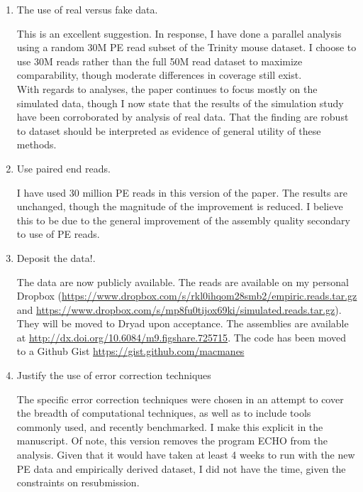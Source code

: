 \documentclass[11pt]{article}
\begin{document}
\begin{enumerate}


\item The use of real versus fake data. 

\begin{addmargin}[2em]{2em}
This is an excellent suggestion. In response, I have done a parallel analysis using a random 30M PE read subset of the Trinity mouse dataset.  I choose to use 30M reads rather than the full 50M read dataset to maximize comparability, though moderate differences in coverage still exist.  \\

\noindent
With regards to analyses, the paper continues to focus mostly on the simulated data, though I now state that the results of the simulation study have been corroborated by analysis of real data.  That the finding are robust to dataset should be interpreted as evidence of general utility of these methods. 
\end{addmargin}

\item Use paired end reads.

\begin{addmargin}[2em]{2em}
I have used 30 million PE reads in this version of the paper. The results are unchanged, though the magnitude of the improvement is reduced. I believe this to be due to the general improvement of the assembly quality secondary to use of PE reads. 
\end{addmargin}

\item Deposit the data!. 
\begin{addmargin}[2em]{2em}
The data are now publicly available. The reads are available on my personal Dropbox (\url{https://www.dropbox.com/s/rkl0ihqom28smb2/empiric.reads.tar.gz} and \url{https://www.dropbox.com/s/mp8fu0tijox69ki/simulated.reads.tar.gz}). They will be moved to Dryad upon acceptance. The assemblies are available at \url{http://dx.doi.org/10.6084/m9.figshare.725715}. The code has been moved to a Github Gist \url{https://gist.github.com/macmanes}
\end{addmargin}


\item Justify the use of error correction techniques 
\begin{addmargin}[2em]{2em}
The specific error correction techniques were chosen in an attempt to cover the breadth of computational techniques, as well as to include tools commonly used, and recently benchmarked. I make this explicit in the manuscript. Of note, this version removes the program ECHO from the analysis. Given that it would have taken at least 4 weeks to run with the new PE data and empirically derived dataset, I did not have the time, given the constraints on resubmission. 
\end{addmargin}


\end{enumerate}
\end{document}
